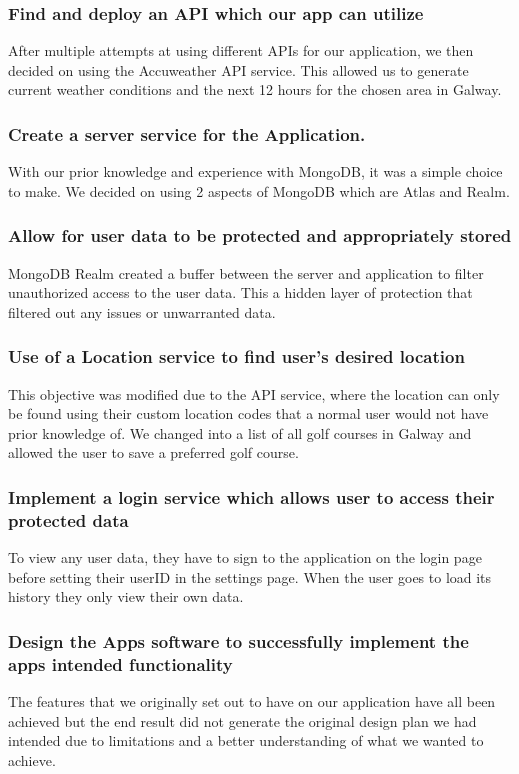 \subsubsection {Find and deploy an API which our app can utilize}
After multiple attempts at using different APIs for our application, we then decided on using the Accuweather API service. This allowed us to generate current weather conditions and the next 12 hours for the chosen area in Galway.
\subsubsection {Create a server service for the Application.}
With our prior knowledge and experience with MongoDB, it was a simple choice to make. We decided on using 2 aspects of MongoDB which are Atlas and Realm.
\subsubsection {Allow for user data to be protected and appropriately stored}
MongoDB Realm created a buffer between the server and application to filter unauthorized access to the user data. This a hidden layer of protection that filtered out any issues or unwarranted data.
\subsubsection {Use of a Location service to find user's desired location}
This objective was modified due to the API service, where the location can only be found using their custom location codes that a normal user would not have prior knowledge of. We changed into a list of all golf courses in Galway and allowed the user to save a preferred golf course.
\subsubsection {Implement a login service which allows user to access their \newline protected data}
To view any user data, they have to sign to the application on the login page before setting their userID in the settings page. When the user goes to load its history they only view their own data.
\subsubsection {Design the Apps software to successfully implement the apps \newline intended functionality}
The features that we originally set out to have on our application have all been achieved but the end result did not generate the original design plan we had intended due to limitations and a better understanding of what we wanted to achieve.
